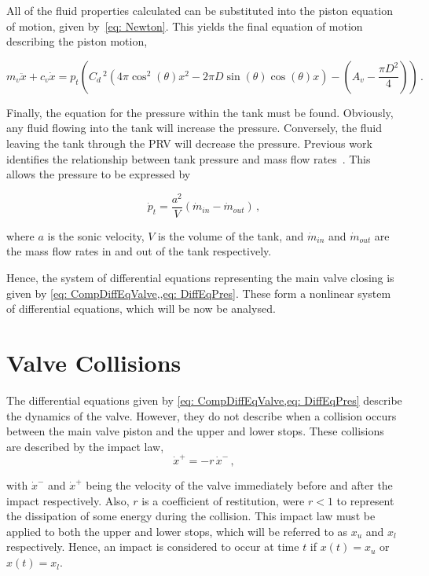 All of the fluid properties calculated can be substituted into the piston equation of motion, given by~\cref{eq: Newton}. This yields the final equation of motion describing the piston motion,

\begin{equation} \label{eq: CompDiffEqValve}
    m_v \ddot{x} + c_v \dot{x} = p_t \left(
    C_d \,^2 \left( 4 \pi \cos^2(\theta) x^2
    - 2 \pi D \sin(\theta) \cos(\theta) x \right)
    - \left( A_v - \frac{\pi D^2}{4} \right)
    \right) \, .
\end{equation}

Finally, the equation for the pressure within the tank must be found. Obviously, any fluid flowing into the tank will increase the pressure. Conversely, the fluid leaving the tank through the PRV will decrease the pressure. Previous work identifies the relationship between tank pressure and mass flow rates~\cite{Hos2015DynamicModelling}. This allows the pressure to be expressed by

\begin{equation} \label{eq: DiffEqPres}
    \dot{p}_t = \frac{a^2}{V} \left( \dot{m}_{in} - \dot{m}_{out} \right) \, ,
\end{equation}

where $a$ is the sonic velocity, $V$ is the volume of the tank, and $\dot{m}_{in}$ and $\dot{m}_{out}$ are the mass flow rates in and out of the tank respectively.

Hence, the system of differential equations representing the main valve closing is given by \cref{eq: CompDiffEqValve,,eq: DiffEqPres}. These form a nonlinear system of differential equations, which will be now be analysed.

\section{Valve Collisions} \label{sec: ValveCollision}

The differential equations given by \cref{eq: CompDiffEqValve,eq: DiffEqPres} describe the dynamics of the valve. However, they do not describe when a collision occurs between the main valve piston and the upper and lower stops. These collisions are described by the impact law,
~
\begin{equation*}
    \dot{x}^+ = - r \, \dot{x}^- \, ,
\end{equation*}

with $\dot{x}^-$ and $\dot{x}^+$ being the velocity of the valve immediately before and after the impact respectively. Also, $r$ is a coefficient of restitution, were $r < 1$ to represent the dissipation of some energy during the collision. This impact law must be applied to both the upper and lower stops, which will be referred to as $x_u$ and $x_l$ respectively. Hence, an impact is considered to occur at time $t$ if $x(t) = x_u$ or $x(t) = x_l$.

